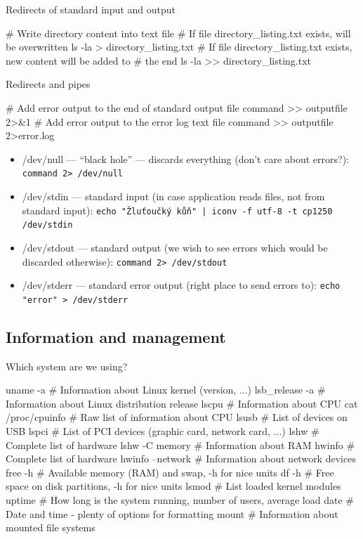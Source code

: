 \documentclass[hyperref={bookmarks=true, unicode=true, colorlinks=true, pdftitle={Linux, command line and MetaCentrum}, plainpages=false, pdfauthor={Vojtech Zeisek}, pdfsubject={Course about use of Linux command line, writing shell scripts and using MetaCentrum of CESNET}, pdfcreator={XeLaTeX, http://www.xelatex.org/}, pdfkeywords={Linux, GNU, BASH, shell, command line, MetaCentrum}, linkcolor=Sienna, anchorcolor=black, citecolor=green, filecolor=magenta, menucolor=Sienna, urlcolor=cyan, pdftex}, compress, ucs, xelatex, xcolor=svgnames, 11pt]{beamer}
\begin{document}
\begin{frame}[fragile]{Redirects of standard input and output}
  \begin{bashcode}
    # Write directory content into text file
    # If file directory_listing.txt exists, will be overwritten
    ls -la > directory_listing.txt
    # If file directory_listing.txt exists, new content will be added to
    # the end
    ls -la >> directory_listing.txt
  \end{bashcode}
\end{frame}

\begin{frame}[fragile, label=pipe]{Redirects and pipes}
  \begin{bashcode}
    # Add error output to the end of standard output file
    command >> outputfile 2>&1
    # Add error output to the error log text file
    command >> outputfile 2>error.log
  \end{bashcode}
\begin{itemize}
  \item /dev/null --- ``black hole'' --- discards everything (don't care about errors?): \texttt{command 2\textgreater~/dev/null}
  \item /dev/stdin --- standard input (in case application reads files, not from standard input): \texttt{echo "Žluťoučký kůň" | iconv -f utf-8 -t cp1250 /dev/stdin}
  \item /dev/stdout --- standard output (we wish to see errors which would be discarded otherwise): \texttt{command 2\textgreater~/dev/stdout}
  \item /dev/stderr --- standard error output (right place to send errors to): \texttt{echo "error" > /dev/stderr}
\end{itemize}
\end{frame}

\subsection{Information and management}

\begin{frame}[fragile]{Which system are we using?}
  \begin{bashcode}
    uname -a # Information about Linux kernel (version, ...)
    lsb_release -a # Information about Linux distribution release
    lscpu # Information about CPU
    cat /proc/cpuinfo # Raw list of information about CPU
    lsusb # List of devices on USB
    lspci # List of PCI devices (graphic card, network card, ...)
    lshw # Complete list of hardware
    lshw -C memory # Information about RAM
    hwinfo # Complete list of hardware
    hwinfo --network # Information about network devices
    free -h # Available memory (RAM) and swap, -h for nice units
    df -h # Free space on disk partitions, -h for nice units
    lsmod # List loaded kernel modules
    uptime # How long is the system running, number of users, average load
    date # Date and time - plenty of options for formatting
    mount # Information about mounted file systems
  \end{bashcode}
\end{frame}
\end{document}
